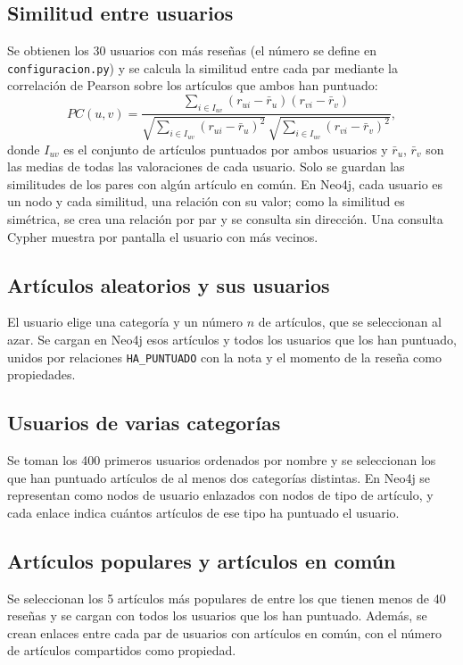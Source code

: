\documentclass[11pt,a4paper]{article}
\newcommand{\code}[1]{\texttt{#1}}
\begin{document}
\subsection{Similitud entre usuarios}

Se obtienen los 30 usuarios con más reseñas (el número se define en \code{configuracion.py}) y se calcula la similitud entre cada par mediante la correlación de Pearson sobre los artículos que ambos han puntuado:
\[
PC(u,v)=\frac{\sum_{i\in I_{uv}}(r_{ui}-\bar r_u)(r_{vi}-\bar r_v)}{\sqrt{\sum_{i\in I_{uv}}(r_{ui}-\bar r_u)^2}\,\sqrt{\sum_{i\in I_{uv}}(r_{vi}-\bar r_v)^2}},
\]
donde $I_{uv}$ es el conjunto de artículos puntuados por ambos usuarios y $\bar r_u$, $\bar r_v$ son las medias de todas las valoraciones de cada usuario. Solo se guardan las similitudes de los pares con algún artículo en común. En Neo4j, cada usuario es un nodo y cada similitud, una relación con su valor; como la similitud es simétrica, se crea una relación por par y se consulta sin dirección. Una consulta Cypher muestra por pantalla el usuario con más vecinos.

\subsection{Artículos aleatorios y sus usuarios}

El usuario elige una categoría y un número $n$ de artículos, que se seleccionan al azar. Se cargan en Neo4j esos artículos y todos los usuarios que los han puntuado, unidos por relaciones \code{HA\_PUNTUADO} con la nota y el momento de la reseña como propiedades.

\subsection{Usuarios de varias categorías}

Se toman los 400 primeros usuarios ordenados por nombre y se seleccionan los que han puntuado artículos de al menos dos categorías distintas. En Neo4j se representan como nodos de usuario enlazados con nodos de tipo de artículo, y cada enlace indica cuántos artículos de ese tipo ha puntuado el usuario.

\subsection{Artículos populares y artículos en común}

Se seleccionan los 5 artículos más populares de entre los que tienen menos de 40 reseñas y se cargan con todos los usuarios que los han puntuado. Además, se crean enlaces entre cada par de usuarios con artículos en común, con el número de artículos compartidos como propiedad.
\end{document}
